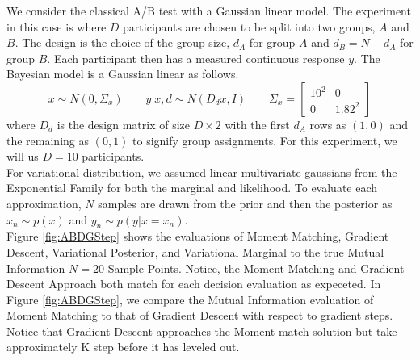 \begin{figure*}[!htb]
    \centering
    \caption{\textbf{A/B Test} for $11$ decisions of assigning $10$ participants to $2$ groups. Because the method is Gaussian linear, each model converges to the true Mutual Information. (a) $20$ samples were used to compute the mutual Information for each decision (b) This plot shows the convergence of the Gradient Descent approach approximation with respect to the number of Gradient Steps. Notice that the Gradient step converges to the Moment Matching Solution but takes $~50$ steps. The Moment Matching reaches this end convergence immediately without needing to do multiple evaluations.}
    \label{fig:ABDGStep}
    \end{figure*}
    
    We consider the classical A/B test with a Gaussian linear model. The experiment 
    in this case is where $D$ participants are chosen to be split into two 
    groups, $A$ and $B$. The design is the choice of the group size, $d_A$ for 
    group $A$ and $d_B=N-d_A$ for group $B$. Each participant then has a measured 
    continuous response $y$. The Bayesian model is a Gaussian linear as follows.
    \begin{equation}
    x\sim N(0,\Sigma_x)\hspace{2em} y|x,d \sim N(D_dx,I)\hspace{2em}\Sigma_x = \begin{bmatrix}
    10^2 & 0 \\
    0 & 1.82^2
    \end{bmatrix}
    \end{equation}
    where $D_d$ is the design matrix of size $D\times 2$ with the first $d_A$ rows 
    as $(1,0)$ and the remaining as $(0,1)$ to signify group assignments. For this 
    experiment, we will us $D=10$ participants.\\
    For variational distribution, we assumed linear multivariate gaussians from 
    the Exponential Family for both the marginal and likelihood. To evaluate each 
    approximation, $N$ samples are drawn from the prior and then the posterior 
    as $x_n\sim p(x)$ and $y_n\sim p(y|x=x_n)$.\\
    
    Figure \ref{fig:ABDGStep} shows the evaluations of Moment Matching, Gradient 
    Descent, Variational Posterior, and Variational Marginal to the true Mutual 
    Information $N=20$ Sample Points. Notice, the Moment Matching and Gradient 
    Descent Approach both match for each decision evaluation as expeceted. In 
    Figure  \ref{fig:ABDGStep}, we compare the Mutual Information evaluation of 
    Moment Matching to that of Gradient Descent with respect to gradient steps. 
    Notice that Gradient Descent approaches the Moment match solution but take 
    approximately K step before it has leveled out.\\
    
